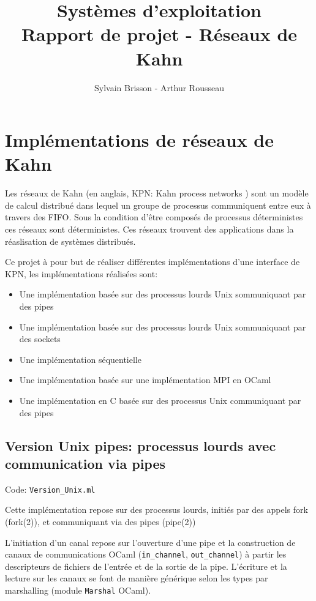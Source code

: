 \documentclass[a4paper]{article}
\title{Systèmes d'exploitation\\Rapport de projet - Réseaux de Kahn}
\author{Sylvain Brisson - Arthur Rousseau}
\date{}
\begin{document}
\maketitle
\noindent

\section{Implémentations de réseaux de Kahn}

Les réseaux de Kahn (en anglais, KPN: Kahn process networks ) sont un modèle de calcul distribué dans lequel un groupe de processus communiquent entre eux à travers des FIFO. Sous la condition d'être composés de processus déterministes ces réseaux sont déterministes. Ces réseaux trouvent des applications dans la réaslisation de systèmes distribués.

Ce projet à pour but de réaliser différentes implémentations d'une interface de KPN, les implémentations réalisées sont:
\begin{itemize}
    \item Une implémentation basée sur des processus lourds Unix sommuniquant par des pipes
    \item Une implémentation basée sur des processus lourds Unix sommuniquant par des sockets
    \item Une implémentation séquentielle 
    \item Une implémentation basée sur une implémentation MPI en OCaml
    \item Une implémentation en C basée sur des processus Unix communiquant par des pipes
\end{itemize}

\subsection{Version Unix pipes: processus lourds avec communication via pipes}

Code: \verb|Version_Unix.ml|

Cette implémentation repose sur des processus lourds, initiés par des appels fork (fork(2)), et communiquant via des pipes (pipe(2))

L'initiation d'un canal repose sur l'ouverture d'une pipe et la construction de canaux de communications OCaml (\texttt{in_channel}, \texttt{out_channel}) à partir les descripteurs de fichiers de l'entrée et de la sortie de la pipe. L'écriture et la lecture sur les canaux se font de manière générique selon les types par marshalling (module \verb|Marshal| OCaml).
\end{document}
